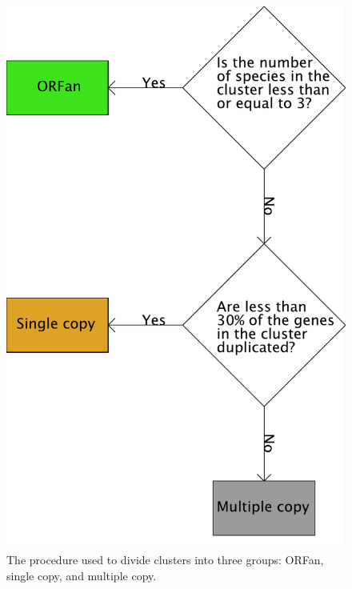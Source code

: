 \documentclass[a4paper,10pt, twocolumn]{article}
\begin{document}
\begin{figure}[H]
\includegraphics[scale=0.25, angle=90]{flowchart_orfan_sing_mult/flowchart-orfansingmult.pdf}
\caption{The procedure used to divide clusters into three groups: ORFan, single copy, and multiple copy.}
\label{fig:orfan-singlecopy-multiplecopy}
\end{figure}
\end{document}
